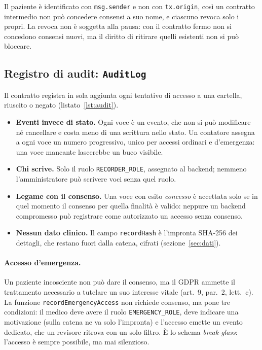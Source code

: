 Il paziente è identificato con \texttt{msg.sender} e non con \texttt{tx.origin}, così un contratto intermedio non può concedere consensi a suo nome, e ciascuno revoca solo i propri. La revoca non è soggetta alla pausa: con il contratto fermo non si concedono consensi nuovi, ma il diritto di ritirare quelli esistenti non si può bloccare.

\subsection{Registro di audit: \texttt{AuditLog}}
Il contratto registra in sola aggiunta ogni tentativo di accesso a una cartella, riuscito o negato (listato~\ref{lst:audit}).
\begin{itemize}
  \item \textbf{Eventi invece di stato.} Ogni voce è un evento, che non si può modificare né cancellare e costa meno di una scrittura nello stato. Un contatore assegna a ogni voce un numero progressivo, unico per accessi ordinari e d'emergenza: una voce mancante lascerebbe un buco visibile.
  \item \textbf{Chi scrive.} Solo il ruolo \texttt{RECORDER\_ROLE}, assegnato al backend; nemmeno l'amministratore può scrivere voci senza quel ruolo.
  \item \textbf{Legame con il consenso.} Una voce con esito \emph{concesso} è accettata solo se in quel momento il consenso per quella finalità è valido: neppure un backend compromesso può registrare come autorizzato un accesso senza consenso.
  \item \textbf{Nessun dato clinico.} Il campo \texttt{recordHash} è l'impronta SHA-256 dei dettagli, che restano fuori dalla catena, cifrati (sezione~\ref{sec:dati}).
\end{itemize}

\paragraph{Accesso d'emergenza.} Un paziente incosciente non può dare il consenso, ma il GDPR ammette il trattamento necessario a tutelare un suo interesse vitale (art.~9, par.~2, lett.~c). La funzione \texttt{recordEmergencyAccess} non richiede consenso, ma pone tre condizioni: il medico deve avere il ruolo \texttt{EMERGENCY\_ROLE}, deve indicare una motivazione (sulla catena ne va solo l'impronta) e l'accesso emette un evento dedicato, che un revisore ritrova con un solo filtro. È lo schema \emph{break-glass}: l'accesso è sempre possibile, ma mai silenzioso.

